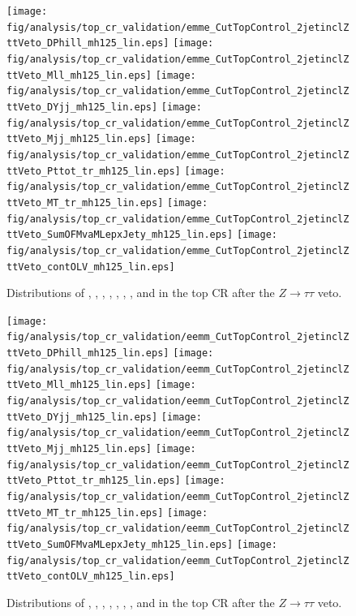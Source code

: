 \begin{figure}[h]
  \centering
   \texttt{[image: fig/analysis/top\_cr\_validation/emme\_CutTopControl\_2jetinclZttVeto\_DPhill\_mh125\_lin.eps]}
   \texttt{[image: fig/analysis/top\_cr\_validation/emme\_CutTopControl\_2jetinclZttVeto\_Mll\_mh125\_lin.eps]}
   \texttt{[image: fig/analysis/top\_cr\_validation/emme\_CutTopControl\_2jetinclZttVeto\_DYjj\_mh125\_lin.eps]}
   \texttt{[image: fig/analysis/top\_cr\_validation/emme\_CutTopControl\_2jetinclZttVeto\_Mjj\_mh125\_lin.eps]}
   \texttt{[image: fig/analysis/top\_cr\_validation/emme\_CutTopControl\_2jetinclZttVeto\_Pttot\_tr\_mh125\_lin.eps]}
   \texttt{[image: fig/analysis/top\_cr\_validation/emme\_CutTopControl\_2jetinclZttVeto\_MT\_tr\_mh125\_lin.eps]}
   \texttt{[image: fig/analysis/top\_cr\_validation/emme\_CutTopControl\_2jetinclZttVeto\_SumOFMvaMLepxJety\_mh125\_lin.eps]}
   \texttt{[image: fig/analysis/top\_cr\_validation/emme\_CutTopControl\_2jetinclZttVeto\_contOLV\_mh125\_lin.eps]}
   \caption{Distributions
   of \dphill, \mll, \dyjj, \mjj, \pTtot, \mT, \SumMlj, and \lepEtaCent
   in the \emme top CR after the $Z\rightarrow{\tau\tau}$ veto.}
  \label{chap:analysis:fig:bdt_inputs_topcr_df}
\end{figure}

\begin{figure}[h]
  \centering
  \texttt{[image: fig/analysis/top\_cr\_validation/eemm\_CutTopControl\_2jetinclZttVeto\_DPhill\_mh125\_lin.eps]}
   \texttt{[image: fig/analysis/top\_cr\_validation/eemm\_CutTopControl\_2jetinclZttVeto\_Mll\_mh125\_lin.eps]}
   \texttt{[image: fig/analysis/top\_cr\_validation/eemm\_CutTopControl\_2jetinclZttVeto\_DYjj\_mh125\_lin.eps]}
   \texttt{[image: fig/analysis/top\_cr\_validation/eemm\_CutTopControl\_2jetinclZttVeto\_Mjj\_mh125\_lin.eps]}
   \texttt{[image: fig/analysis/top\_cr\_validation/eemm\_CutTopControl\_2jetinclZttVeto\_Pttot\_tr\_mh125\_lin.eps]}
   \texttt{[image: fig/analysis/top\_cr\_validation/eemm\_CutTopControl\_2jetinclZttVeto\_MT\_tr\_mh125\_lin.eps]}
   \texttt{[image: fig/analysis/top\_cr\_validation/eemm\_CutTopControl\_2jetinclZttVeto\_SumOFMvaMLepxJety\_mh125\_lin.eps]}
   \texttt{[image: fig/analysis/top\_cr\_validation/eemm\_CutTopControl\_2jetinclZttVeto\_contOLV\_mh125\_lin.eps]}
   \caption{Distributions
   of \dphill, \mll, \dyjj, \mjj, \pTtot, \mT, \SumMlj, and \lepEtaCent
   in the \eemm top CR after the $Z\rightarrow{\tau\tau}$ veto.}
  \label{chap:analysis:fig:bdt_inputs_topcr_sf}
\end{figure}

